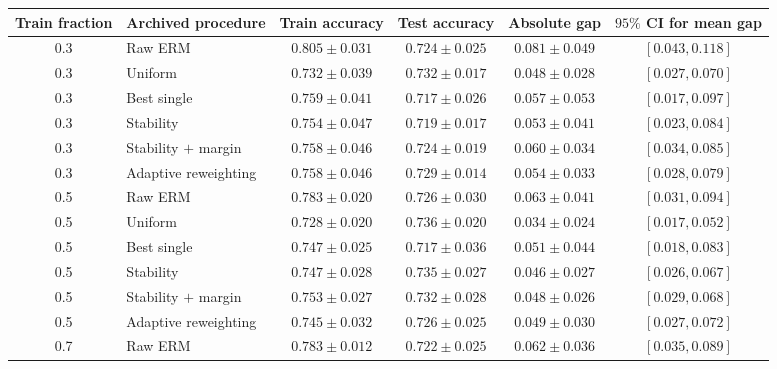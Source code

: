 \begin{table}[p]
\centering
\scriptsize
\setlength{\tabcolsep}{4pt}
\renewcommand{\arraystretch}{0.96}
\begin{tabular}{clcccc}
\toprule
Train fraction & Archived procedure & Train accuracy & Test accuracy & Absolute gap & \(95\%\) CI for mean gap \\
\midrule
0.3 & Raw ERM & \(0.805\mathbin{\pm}0.031\) & \(0.724\mathbin{\pm}0.025\) & \(0.081\mathbin{\pm}0.049\) & \([0.043,0.118]\) \\
0.3 & Uniform & \(0.732\mathbin{\pm}0.039\) & \(0.732\mathbin{\pm}0.017\) & \(0.048\mathbin{\pm}0.028\) & \([0.027,0.070]\) \\
0.3 & Best single & \(0.759\mathbin{\pm}0.041\) & \(0.717\mathbin{\pm}0.026\) & \(0.057\mathbin{\pm}0.053\) & \([0.017,0.097]\) \\
0.3 & Stability & \(0.754\mathbin{\pm}0.047\) & \(0.719\mathbin{\pm}0.017\) & \(0.053\mathbin{\pm}0.041\) & \([0.023,0.084]\) \\
0.3 & Stability \(+\) margin & \(0.758\mathbin{\pm}0.046\) & \(0.724\mathbin{\pm}0.019\) & \(0.060\mathbin{\pm}0.034\) & \([0.034,0.085]\) \\
0.3 & Adaptive reweighting & \(0.758\mathbin{\pm}0.046\) & \(0.729\mathbin{\pm}0.014\) & \(0.054\mathbin{\pm}0.033\) & \([0.028,0.079]\) \\
\midrule
0.5 & Raw ERM & \(0.783\mathbin{\pm}0.020\) & \(0.726\mathbin{\pm}0.030\) & \(0.063\mathbin{\pm}0.041\) & \([0.031,0.094]\) \\
0.5 & Uniform & \(0.728\mathbin{\pm}0.020\) & \(0.736\mathbin{\pm}0.020\) & \(0.034\mathbin{\pm}0.024\) & \([0.017,0.052]\) \\
0.5 & Best single & \(0.747\mathbin{\pm}0.025\) & \(0.717\mathbin{\pm}0.036\) & \(0.051\mathbin{\pm}0.044\) & \([0.018,0.083]\) \\
0.5 & Stability & \(0.747\mathbin{\pm}0.028\) & \(0.735\mathbin{\pm}0.027\) & \(0.046\mathbin{\pm}0.027\) & \([0.026,0.067]\) \\
0.5 & Stability \(+\) margin & \(0.753\mathbin{\pm}0.027\) & \(0.732\mathbin{\pm}0.028\) & \(0.048\mathbin{\pm}0.026\) & \([0.029,0.068]\) \\
0.5 & Adaptive reweighting & \(0.745\mathbin{\pm}0.032\) & \(0.726\mathbin{\pm}0.025\) & \(0.049\mathbin{\pm}0.030\) & \([0.027,0.072]\) \\
\midrule
0.7 & Raw ERM & \(0.783\mathbin{\pm}0.012\) & \(0.722\mathbin{\pm}0.025\) & \(0.062\mathbin{\pm}0.036\) & \([0.035,0.089]\) \\

\end{tabular}
\end{table}
